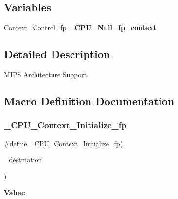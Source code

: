 \subsection*{Variables}
\begin{DoxyCompactItemize}
\item 
\mbox{\label{group__RTEMSScoreCPUMIPS_gaf07fa780651217bccbbd992ae527164c}} 
\mbox{\hyperlink{structContext__Control__fp}{Context\+\_\+\+Control\+\_\+fp}} {\bfseries \+\_\+\+C\+P\+U\+\_\+\+Null\+\_\+fp\+\_\+context}
\end{DoxyCompactItemize}


\subsection{Detailed Description}
M\+I\+PS Architecture Support. 



\subsection{Macro Definition Documentation}
\mbox{\label{group__RTEMSScoreCPUMIPS_gac34a28abe9b31559d4096b2c942860a6}} 
\subsubsection{\texorpdfstring{\_CPU\_Context\_Initialize\_fp}{\_CPU\_Context\_Initialize\_fp}}
{\footnotesize\ttfamily \#define \+\_\+\+C\+P\+U\+\_\+\+Context\+\_\+\+Initialize\+\_\+fp(\begin{DoxyParamCaption}\item[{}]{\+\_\+destination }\end{DoxyParamCaption})}

{\bfseries Value\+:}
\begin{DoxyCode}{0}
\DoxyCodeLine{\{ \(\backslash\)}
\DoxyCodeLine{  \}}

\end{DoxyCode}
\mbox{\label{group__RTEMSScoreCPUMIPS_ga4c07c0150ec7894dd128993e931ceee5}} 
